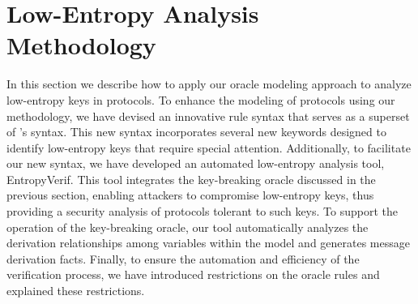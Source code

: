 \section{Low-Entropy Analysis Methodology} \label{sec:4extension-and-compilation}
% 



In this section we describe how to apply our oracle modeling approach to analyze low-entropy keys in protocols.
To enhance the modeling of protocols using our methodology, we have devised an innovative rule syntax that serves as a superset of \Tamarin{}'s syntax. 
This new syntax incorporates several new keywords designed to identify low-entropy keys that require special attention. 
Additionally, to facilitate our new syntax, we have developed an automated low-entropy analysis tool, EntropyVerif. 
This tool integrates the key-breaking oracle discussed in the previous section, enabling attackers
to compromise low-entropy keys, thus providing a security analysis of protocols tolerant to such
keys.
To support the operation of the key-breaking oracle, our tool automatically analyzes the derivation relationships among variables within the model and generates message derivation facts. 
Finally, to ensure the automation and efficiency of the verification process, we have introduced restrictions on the oracle rules and explained these restrictions.

